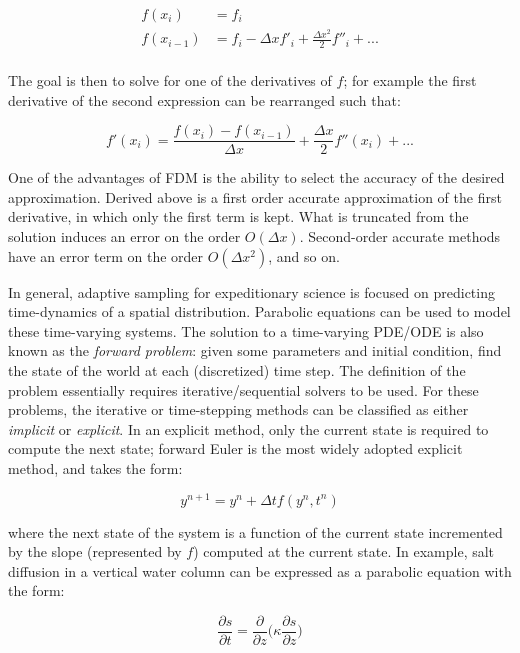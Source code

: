 \begin{align}
	f(x_i) &= f_i\\
	f(x_{i-1}) &= f_i - \Delta x f'_i + \frac{\Delta x^2}{2}f''_i + ...\\
\end{align}

The goal is then to solve for one of the derivatives of $f$; for example the first derivative of the second expression can be rearranged such that:

\begin{equation}
	f'(x_i) = \frac{f(x_i) - f(x_{i-1})}{\Delta x} + \frac{\Delta x}{2}f''(x_i) + ...
\end{equation}

One of the advantages of FDM is the ability to select the accuracy of the desired approximation. Derived above is a first order accurate approximation of the first derivative, in which only the first term is kept. What is truncated from the solution induces an error on the order $O(\Delta x)$. Second-order accurate methods have an error term on the order $O(\Delta x^2)$, and so on.

In general, adaptive sampling for expeditionary science is focused on predicting time-dynamics of a spatial distribution. Parabolic equations can be used to model these time-varying systems. The solution to a time-varying PDE/ODE is also known as the \emph{forward problem}: given some parameters and initial condition, find the state of the world at each (discretized) time step. The definition of the problem essentially requires iterative/sequential solvers to be used. For these problems, the iterative or time-stepping methods can be classified as either \emph{implicit} or \emph{explicit}\autocite{biswas2013discussion,hahn1991modified}. In an explicit method, only the current state is required to compute the next state; forward Euler is the most widely adopted explicit method, and takes the form:

\begin{equation}
	y^{n+1} = y^n + \Delta t f(y^n,t^n)
\end{equation}

\noindent where the next state of the system is a function of the current state incremented by the slope (represented by $f$) computed at the current state. In example, salt diffusion in a vertical water column can be expressed as a parabolic equation with the form:

\begin{equation}
	\frac{\partial s}{\partial t} = \frac{\partial}{\partial z}\Big(\kappa \frac{\partial s}{\partial z}\Big)
	\label{eqn:salt}
\end{equation}

